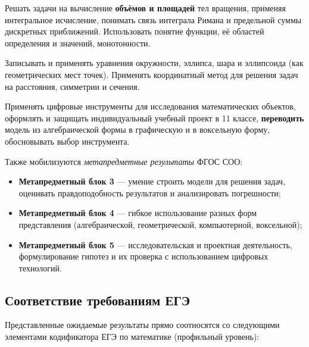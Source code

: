 \documentclass[12pt,a4paper]{scrartcl}
\newcommand{\acc}[1]{\textcolor{accent}{\textbf{#1}}}
\begin{document}
\begin{standart}
Решать задачи на вычисление \acc{объёмов и площадей} тел вращения, применяя интегральное исчисление, понимать связь интеграла Римана и предельной суммы дискретных приближений. Использовать понятие функции, её областей определения и значений, монотонности.
\end{standart}

\begin{standart}
Записывать и применять уравнения окружности, эллипса, шара и эллипсоида (как геометрических мест точек). Применять координатный метод для решения задач на расстояния, симметрии и сечения.
\end{standart}

\begin{standart}
Применять цифровые инструменты для исследования математических объектов, оформлять и защищать индивидуальный учебный проект в 11 классе, \acc{переводить} модель из алгебраической формы в графическую и в воксельную форму, обосновывать выбор инструмента.
\end{standart}

\medskip
Также мобилизуются \emph{метапредметные результаты} ФГОС СОО:

\begin{itemize}[leftmargin=1.3em,itemsep=0.15em,topsep=0.3em]
  \item \acc{Метапредметный блок 3} --- умение строить модели для решения задач, оценивать правдоподобность результатов и анализировать погрешности;
  \item \acc{Метапредметный блок 4} --- гибкое использование разных форм представления (алгебраической, геометрической, компьютерной, воксельной);
  \item \acc{Метапредметный блок 5} --- исследовательская и проектная деятельность, формулирование гипотез и их проверка с использованием цифровых технологий.
\end{itemize}

\subsection{Соответствие требованиям ЕГЭ}\label{sec:ege}

Представленные ожидаемые результаты прямо соотносятся со следующими элементами кодификатора ЕГЭ по математике (профильный уровень):
\end{document}
